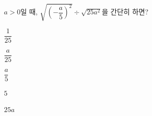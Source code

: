 $a>0$일 때, $\sqrt{\left(-\dfrac{a}{5}\right)^2}\div\sqrt{25a^2}$을 간단히 하면?
\begin{choices32}{\rule[-3ex]{0pt}{8ex}$\dfrac{1}{25}$}{\rule[-3ex]{0pt}{8ex}$\dfrac{a}{25}$}{\rule[-3ex]{0pt}{8ex}$\dfrac{a}{5}$}{\rule[-3ex]{0pt}{8ex}$5$}{\rule[-3ex]{0pt}{8ex}$25a$}\end{choices32}

